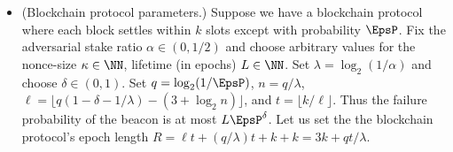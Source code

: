 \begin{itemize}
    \item (Blockchain protocol parameters.) 
    Suppose we have a blockchain protocol where each block settles within $k$ slots 
    except with probability $\EpsP$. 
    Fix the adversarial stake ratio $\alpha \in (0, 1/2)$ and 
    choose arbitrary values for the nonce-size $\kappa \in \NN$, 
    lifetime (in epochs) $L \in \NN$. 
    Set $\lambda = \log_2(1/\alpha)$ and choose 
    $\delta \in (0,1)$.
    Set $q = \log_2(1/\EpsP)$, $n = q/\lambda$, 
    $\ell = \lfloor q(1 - \delta - 1/\lambda) - (3 + \log_2n ) \rfloor$, and
    $t = \lfloor k/\ell \rfloor$. 
    Thus the failure probability of the beacon is at most $L \EpsP^\delta$. 
    Let us set the the blockchain protocol's epoch length 
    $R = \ell t+(q/\lambda)t+k+k = 3k+qt/\lambda$. 


    
    
\end{itemize}

